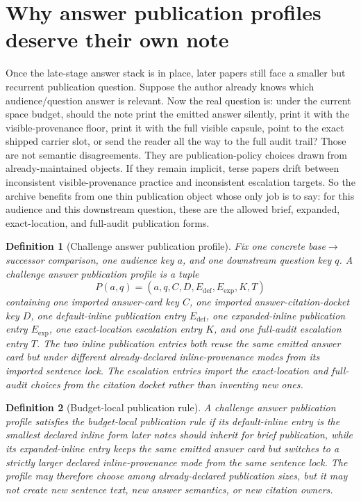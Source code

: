 \documentclass[11pt]{article}
\newtheorem{definition}{Definition}
\begin{document}
\section{Why answer publication profiles deserve their own note}
Once the late-stage answer stack is in place, later papers still face a smaller but recurrent publication question.
Suppose the author already knows which audience/question answer is relevant.
Now the real question is: under the current space budget, should the note print the emitted answer silently, print it with the visible-provenance floor, print it with the full visible capsule, point to the exact shipped carrier slot, or send the reader all the way to the full audit trail?
Those are not semantic disagreements.
They are publication-policy choices drawn from already-maintained objects.
If they remain implicit, terse papers drift between inconsistent visible-provenance practice and inconsistent escalation targets.
So the archive benefits from one thin publication object whose only job is to say: for this audience and this downstream question, these are the allowed brief, expanded, exact-location, and full-audit publication forms.

\begin{definition}[Challenge answer publication profile]
Fix one concrete base$\to$successor comparison, one audience key $a$, and one downstream question key $q$.
A \emph{challenge answer publication profile} is a tuple
\[
P(a,q)=(a,q,C,D,E_{\mathrm{def}},E_{\mathrm{exp}},K,T)
\]
containing one imported answer-card key $C$, one imported answer-citation-docket key $D$, one default-inline publication entry $E_{\mathrm{def}}$, one expanded-inline publication entry $E_{\mathrm{exp}}$, one exact-location escalation entry $K$, and one full-audit escalation entry $T$.
The two inline publication entries both reuse the same emitted answer card but under different already-declared inline-provenance modes from its imported sentence lock.
The escalation entries import the exact-location and full-audit choices from the citation docket rather than inventing new ones.
\end{definition}

\begin{definition}[Budget-local publication rule]
A challenge answer publication profile satisfies the \emph{budget-local publication rule} if its default-inline entry is the smallest declared inline form later notes should inherit for brief publication, while its expanded-inline entry keeps the same emitted answer card but switches to a strictly larger declared inline-provenance mode from the same sentence lock.
The profile may therefore choose among already-declared publication sizes, but it may not create new sentence text, new answer semantics, or new citation owners.
\end{definition}
\end{document}
